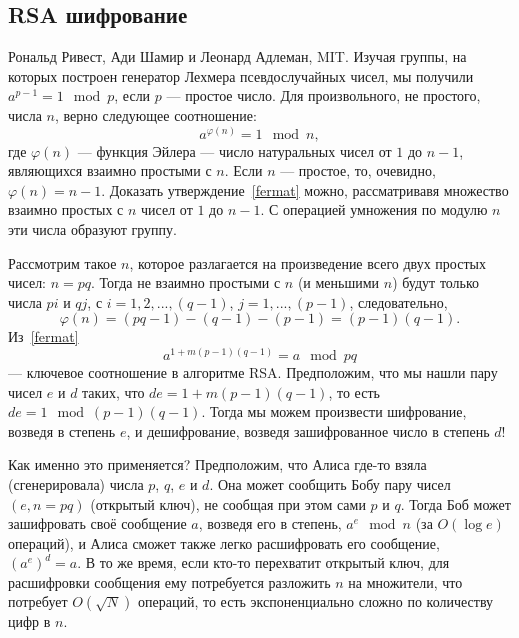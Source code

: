 \documentclass{book}
\begin{document}
\subsection{RSA шифрование}

Рональд Ривест, Ади Шамир и Леонард Адлеман, MIT. Изучая группы, на которых построен генератор
Лехмера псевдослучайных чисел, мы получили $a^{p - 1} = 1 \mod p$, если $p$ --- простое число. Для
произвольного, не простого, числа $n$, верно следующее соотношение:
\begin{equation}
    \label{fermat}
    a^{\varphi(n)} = 1 \mod n,
\end{equation}
где $\varphi(n)$ --- функция Эйлера --- число натуральных чисел от $1$ до $n - 1$, являющихся
взаимно простыми с $n$. Если $n$ --- простое, то, очевидно, $\varphi(n) = n - 1$. Доказать
утверждение~\ref{fermat} можно, рассматривавя множество взаимно простых с $n$ чисел от $1$ до $n -
1$. С операцией умножения по модулю $n$ эти числа образуют группу.

Рассмотрим такое $n$, которое разлагается на произведение всего двух простых чисел: $n = pq$. Тогда
не взаимно простыми с $n$ (и меньшими $n$) будут только числа $pi$ и $q j$, с $i = 1, 2, ..., (q -
1)$, $j = 1,..., (p  - 1)$, следовательно,
\begin{equation}
    \varphi(n) = (p q - 1) - (q - 1) - (p - 1) = (p - 1)(q - 1).
\end{equation}
Из~\ref{fermat}
\begin{equation}
    a^{1 + m (p - 1) (q - 1)} = a \mod pq
\end{equation}
--- ключевое соотношение в алгоритме RSA. Предположим, что мы нашли пару чисел $e$ и $d$ таких, что
$de = 1 + m (p - 1) (q - 1)$, то есть $de = 1 \mod (p - 1) (q - 1)$. Тогда мы можем произвести
шифрование, возведя в степень $e$, и дешифрование, возведя зашифрованное число в степень $d$!

Как именно это применяется? Предположим, что Алиса где-то взяла (сгенерировала) числа $p$, $q$, $e$
и $d$. Она может сообщить Бобу пару чисел $(e, n = pq)$ (открытый ключ), не сообщая при этом сами
$p$ и $q$. Тогда Боб может зашифровать своё сообщение $a$, возведя его в степень, $a^e \mod n$ (за
$O(\log e)$ операций), и Алиса сможет также легко расшифровать его сообщение, $(a^e)^d = a$. В то
же время, если кто-то перехватит открытый ключ, для расшифровки сообщения ему потребуется разложить
$n$ на множители, что потребует $O(\sqrt{N})$ операций, то есть экспоненциально сложно по
количеству цифр в $n$.
\end{document}
